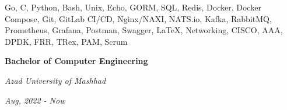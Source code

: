 \documentclass{engineercv}
\begin{document}
\begin{multicols}{2}
  \begin{minipage}{0.45\textwidth}
    Go, C, Python, Bash, Unix, Echo, GORM, SQL, Redis, Docker, Docker Compose, Git, GitLab CI/CD,
    Nginx/NAXI, NATS.io, Kafka, RabbitMQ, Prometheus, Grafana, Postman, Swagger, \LaTeX, Networking,
    CISCO, AAA, DPDK, FRR, TRex, PAM, Scrum
  \end{minipage}
  \columnbreak
  \begin{minipage}{0.45\textwidth}
    \textbf{Bachelor of Computer Engineering}

    \textit{Azad University of Mashhad}

    \textit{Aug, 2022 - Now}
  \end{minipage}
\end{multicols}
\end{document}
